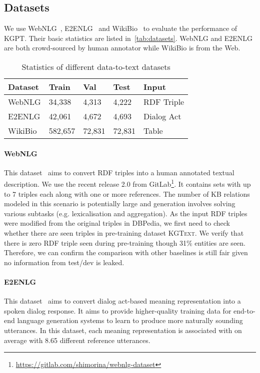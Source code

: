 \documentclass[11pt,a4paper]{article}
\newcommand{\dataset}{\textsc{KGText}\xspace}
\newcommand{\model}{KGPT\xspace}
\begin{document}
\subsection{Datasets}
We use WebNLG~\cite{shimorina2018handling}, E2ENLG~\cite{dusek2019e2e} and WikiBio~\cite{lebret2016neural} to evaluate the performance of \model. Their basic statistics are listed in~\autoref{tab:datasets}. WebNLG and E2ENLG are both crowd-sourced by human annotator while WikiBio is from the Web.
\begin{table}[!thb]
\small
\begin{tabular}{lllll}
\hline
Dataset & Train & Val & Test & Input \\
\hline
WebNLG  & 34,338 & 4,313 & 4,222 & RDF Triple \\
E2ENLG & 42,061  & 4,672 & 4,693 & Dialog Act \\
WikiBio & 582,657 & 72,831 & 72,831 & Table \\
\hline
\end{tabular}
\caption{Statistics of different data-to-text datasets}
\label{tab:datasets}
\vspace{-2ex}
\end{table}
\paragraph{WebNLG}
This dataset~\cite{shimorina2018handling} aims to convert RDF triples into a human annotated textual description. We use the recent release 2.0 from GitLab\footnote{\url{https://gitlab.com/shimorina/webnlg-dataset}}. It contains sets with up to 7 triples each along with one or more references. The number of KB relations modeled in this scenario is potentially large and generation involves solving various subtasks (e.g. lexicalisation and aggregation). As the input RDF triples were modified from the original triples in DBPedia, we first need to check whether there are seen triples in pre-training dataset \dataset. We verify that there is zero RDF triple seen during pre-training though 31\% entities are seen. Therefore, we can confirm the comparison with other baselines is still fair given no information from test/dev is leaked.  
\paragraph{E2ENLG}
This dataset~\cite{dusek2019e2e} aims to convert dialog act-based meaning representation into a spoken dialog response. It aims to provide higher-quality training data for end-to-end language generation systems to learn to produce more naturally sounding utterances. In this dataset, each meaning representation is associated with on average with 8.65 different reference utterances. 
\end{document}
